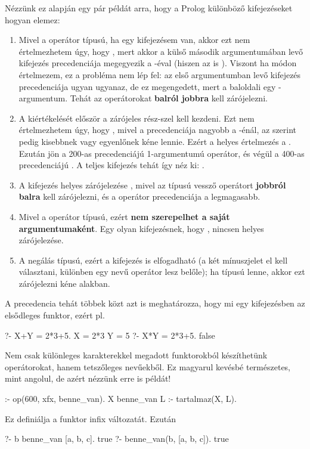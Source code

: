 Nézzünk ez alapján egy pár példát arra, hogy a
Prolog különböző kifejezéseket hogyan elemez:
\begin{enumerate}
\item Mivel a \pr{+} operátor  típusú, ha
  egy  kifejezésem van, akkor ezt nem
  értelmezhetem úgy, hogy , mert
  akkor a külső \pr{+} második argumentumában levő
   kifejezés precedenciája megegyezik a
  \pr{+}-éval (hiszen az is \pr{+}). Viszont ha
   módon értelmezem, ez a probléma
  nem lép fel: az első argumentumban levő  kifejezés precedenciája ugyan ugyanaz, de ez
  megengedett, mert a baloldali egy
  -argumentum. Tehát az  operátorokat
  {\bf balról jobbra} kell zárójelezni.
\item A  kiértékelését először
  a zárójeles rész-szel kell kezdeni. Ezt nem
  értelmezhetem úgy, hogy , mivel
  a \pr{+} precedenciája nagyobb a \pr{*}-énál, az
   szerint pedig kisebbnek vagy egyenlőnek
  kéne lennie. Ezért a helyes értelmezés a . Ezután jön a 200-as precedenciájú
  1-argumentumú \pr{-} operátor, és végül a 400-as
  precedenciájú \pr{*}. A teljes kifejezés tehát így
  néz ki: .
\item A  kifejezés helyes
  zárójelezése , mivel
  az  típusú vessző operátort {\bf jobbról
  balra} kell zárójelezni, és a \pr{:-} operátor
  precedenciája a legmagasabb.
\item Mivel a \pr{:-} operátor  típusú,
  ezért {\bf nem szerepelhet a saját
  argumentumaként}. Egy olyan kifejezésnek, hogy
  , nincsen helyes zárójelezése.
\item A negálás  típusú, ezért a 
  kifejezés is elfogadható (a két mínuszjelet el
  kell választani, különben egy \pr{-{}-} nevű
  operátor lesz belőle); ha  típusú lenne,
  akkor ezt zárójelezni kéne  alakban.
\end{enumerate}
A precedencia tehát többek közt azt is meghatározza,
hogy mi egy kifejezésben az elsődleges funktor,
ezért pl.
\begin{query}
?- X+Y = 2*3+5.
X = 2*3
Y = 5
?- X*Y = 2*3+5.
false
\end{query}

Nem csak különleges karakterekkel megadott
funktorokból készíthetünk operátorokat, hanem
tetszőleges nevűekből. Ez magyarul kevésbé
természetes, mint angolul, de azért nézzünk erre is
példát!
\begin{query}
:- op(600, xfx, benne_van).
X benne_van L :- tartalmaz(X, L).
\end{query}
Ez definiálja a  funktor infix
változatát. Ezután
\begin{query}
?- b benne_van [a, b, c].
true
?- benne_van(b, [a, b, c]).
true
\end{query}

